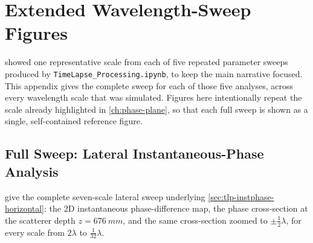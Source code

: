 \chapter{Extended Wavelength-Sweep Figures}
\label{app:extended-sweeps}

 showed one representative scale from each of five
repeated parameter sweeps produced by \texttt{TimeLapse\_Processing.ipynb},
to keep the main narrative focused. This appendix gives the complete sweep
for each of those five analyses, across every wavelength scale that was
simulated. Figures here intentionally repeat the scale already highlighted
in \cref{ch:phase-plane}, so that each full sweep is shown as a single,
self-contained reference figure.

\section{Full Sweep: Lateral Instantaneous-Phase Analysis}
\label{app:sec-instphase-horizontal}

give the complete seven-scale lateral sweep underlying
\cref{sec:tlp-instphase-horizontal}: the 2D instantaneous phase-difference
map, the phase cross-section at the scatterer depth $z=\SI{676}{mm}$, and
the same cross-section zoomed to $\pm\tfrac12\lambda$, for every scale from
$2\lambda$ to $\tfrac{1}{32}\lambda$.

